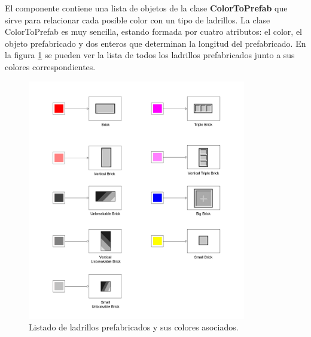 El componente contiene una lista de objetos de la clase \textbf{ColorToPrefab} que sirve para relacionar cada posible color con un tipo de ladrillos. La clase ColorToPrefab es muy sencilla, estando formada por cuatro atributos: el color, el objeto prefabricado y dos enteros que determinan la longitud del prefabricado. En la figura \ref{prefab_color} se pueden ver la lista de todos los ladrillos prefabricados junto a sus colores correspondientes.
\begin{figure}[!t]
	\includegraphics[width=0.85\textwidth]{images/estructura/niveles/prefab_colors}
	\centering
	\caption{Listado de ladrillos prefabricados y sus colores asociados.}
	\label{prefab_color}
\end{figure}

